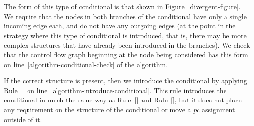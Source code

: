 The form of this type of conditional is that shown in
Figure~\ref{divergent-figure}.
We require that the nodes in both branches of the conditional have
only a single incoming edge each, and do not have any outgoing edges
(at the point in the strategy where this type of conditional is
introduced, that is, there may be more complex structures that have
already been introduced in the branches).
We check that the control flow graph beginning at the node being
considered has this form on line~\ref{algorithm-conditional-check} of
the algorithm.

If the correct structure is present, then we introduce the conditional
by applying Rule~[] on
line~\ref{algorithm-introduce-conditional}.
This rule introduces the conditional in much the same way as
Rule~[] and
Rule~[], but it does not place any
requirement on the structure of the conditional or move a $pc$
assignment outside of it.
